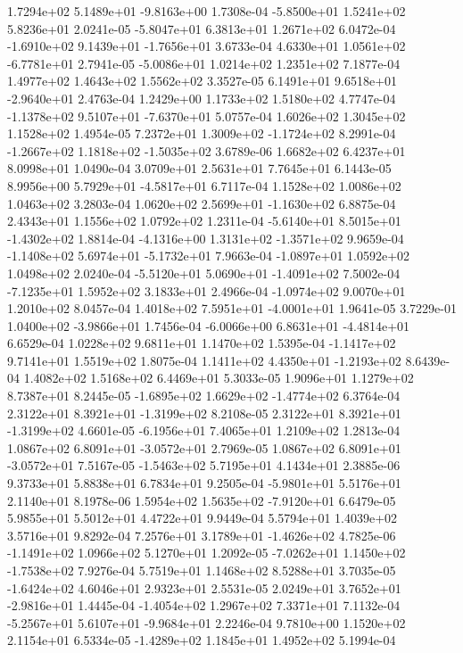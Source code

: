  1.7294e+02  5.1489e+01 -9.8163e+00  1.7308e-04
-5.8500e+01  1.5241e+02  5.8236e+01  2.0241e-05
-5.8047e+01  6.3813e+01  1.2671e+02  6.0472e-04
-1.6910e+02  9.1439e+01 -1.7656e+01  3.6733e-04
 4.6330e+01  1.0561e+02 -6.7781e+01  2.7941e-05
-5.0086e+01  1.0214e+02  1.2351e+02  7.1877e-04
1.4977e+02 1.4643e+02 1.5562e+02  3.3527e-05
 6.1491e+01  9.6518e+01 -2.9640e+01  2.4763e-04
1.2429e+00 1.1733e+02 1.5180e+02  4.7747e-04
-1.1378e+02  9.5107e+01 -7.6370e+01  5.0757e-04
1.6026e+02 1.3045e+02 1.1528e+02  1.4954e-05
 7.2372e+01  1.3009e+02 -1.1724e+02  8.2991e-04
-1.2667e+02  1.1818e+02 -1.5035e+02  3.6789e-06
1.6682e+02 6.4237e+01 8.0998e+01  1.0490e-04
3.0709e+01 2.5631e+01 7.7645e+01  6.1443e-05
 8.9956e+00  5.7929e+01 -4.5817e+01  6.7117e-04
1.1528e+02 1.0086e+02 1.0463e+02  3.2803e-04
 1.0620e+02  2.5699e+01 -1.1630e+02  6.8875e-04
2.4343e+01 1.1556e+02 1.0792e+02  1.2311e-04
-5.6140e+01  8.5015e+01 -1.4302e+02  1.8814e-04
-4.1316e+00  1.3131e+02 -1.3571e+02  9.9659e-04
-1.1408e+02  5.6974e+01 -5.1732e+01  7.9663e-04
-1.0897e+01  1.0592e+02  1.0498e+02  2.0240e-04
-5.5120e+01  5.0690e+01 -1.4091e+02  7.5002e-04
-7.1235e+01  1.5952e+02  3.1833e+01  2.4966e-04
-1.0974e+02  9.0070e+01  1.2010e+02  8.0457e-04
 1.4018e+02  7.5951e+01 -4.0001e+01  1.9641e-05
 3.7229e-01  1.0400e+02 -3.9866e+01  1.7456e-04
-6.0066e+00  6.8631e+01 -4.4814e+01  6.6529e-04
1.0228e+02 9.6811e+01 1.1470e+02  1.5395e-04
-1.1417e+02  9.7141e+01  1.5519e+02  1.8075e-04
 1.1411e+02  4.4350e+01 -1.2193e+02  8.6439e-04
1.4082e+02 1.5168e+02 6.4469e+01  5.3033e-05
1.9096e+01 1.1279e+02 8.7387e+01  8.2445e-05
-1.6895e+02  1.6629e+02 -1.4774e+02  6.3764e-04
 2.3122e+01  8.3921e+01 -1.3199e+02  8.2108e-05
 2.3122e+01  8.3921e+01 -1.3199e+02  4.6601e-05
-6.1956e+01  7.4065e+01  1.2109e+02  1.2813e-04
 1.0867e+02  6.8091e+01 -3.0572e+01  2.7969e-05
 1.0867e+02  6.8091e+01 -3.0572e+01  7.5167e-05
-1.5463e+02  5.7195e+01  4.1434e+01  2.3885e-06
9.3733e+01 5.8838e+01 6.7834e+01  9.2505e-04
-5.9801e+01  5.5176e+01  2.1140e+01  8.1978e-06
 1.5954e+02  1.5635e+02 -7.9120e+01  6.6479e-05
5.9855e+01 5.5012e+01 4.4722e+01  9.9449e-04
5.5794e+01 1.4039e+02 3.5716e+01  9.8292e-04
 7.2576e+01  3.1789e+01 -1.4626e+02  4.7825e-06
-1.1491e+02  1.0966e+02  5.1270e+01  1.2092e-05
-7.0262e+01  1.1450e+02 -1.7538e+02  7.9276e-04
5.7519e+01 1.1468e+02 8.5288e+01  3.7035e-05
-1.6424e+02  4.6046e+01  2.9323e+01  2.5531e-05
 2.0249e+01  3.7652e+01 -2.9816e+01  1.4445e-04
-1.4054e+02  1.2967e+02  7.3371e+01  7.1132e-04
-5.2567e+01  5.6107e+01 -9.9684e+01  2.2246e-04
9.7810e+00 1.1520e+02 2.1154e+01  6.5334e-05
-1.4289e+02  1.1845e+01  1.4952e+02  5.1994e-04
